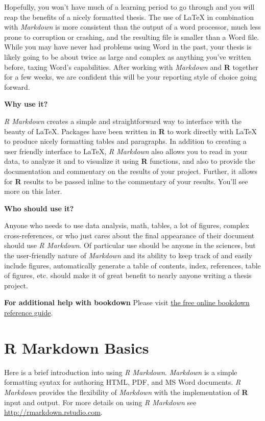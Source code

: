\documentclass[12pt,twoside]{reedthesis}
\begin{document}
Hopefully, you won't have much of a learning period to go through and you will reap the benefits of a nicely formatted thesis. The use of LaTeX in combination with \emph{Markdown} is more consistent than the output of a word processor, much less prone to corruption or crashing, and the resulting file is smaller than a Word file. While you may have never had problems using Word in the past, your thesis is likely going to be about twice as large and complex as anything you've written before, taxing Word's capabilities. After working with \emph{Markdown} and \textbf{R} together for a few weeks, we are confident this will be your reporting style of choice going forward.

\textbf{Why use it?}

\emph{R Markdown} creates a simple and straightforward way to interface with the beauty of LaTeX. Packages have been written in \textbf{R} to work directly with LaTeX to produce nicely formatting tables and paragraphs. In addition to creating a user friendly interface to LaTeX, \emph{R Markdown} also allows you to read in your data, to analyze it and to visualize it using \textbf{R} functions, and also to provide the documentation and commentary on the results of your project. Further, it allows for \textbf{R} results to be passed inline to the commentary of your results. You'll see more on this later.

\textbf{Who should use it?}

Anyone who needs to use data analysis, math, tables, a lot of figures, complex cross-references, or who just cares about the final appearance of their document should use \emph{R Markdown}. Of particular use should be anyone in the sciences, but the user-friendly nature of \emph{Markdown} and its ability to keep track of and easily include figures, automatically generate a table of contents, index, references, table of figures, etc. should make it of great benefit to nearly anyone writing a thesis project.

\textbf{For additional help with bookdown}
Please visit \href{https://bookdown.org/yihui/bookdown/}{the free online bookdown reference guide}.

\chapter{R Markdown Basics}\label{rmd-basics}

Here is a brief introduction into using \emph{R Markdown}. \emph{Markdown} is a simple formatting syntax for authoring HTML, PDF, and MS Word documents. \emph{R Markdown} provides the flexibility of \emph{Markdown} with the implementation of \textbf{R} input and output. For more details on using \emph{R Markdown} see \url{http://rmarkdown.rstudio.com}.
\end{document}

